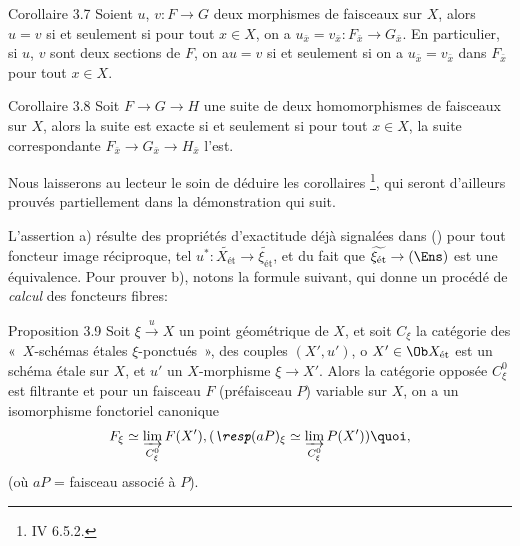 \documentclass[10pt]{../fichiers-configuration-latex/smfart}
\begin{document}
\begin{enonce*}{Corollaire 3.7}
Soient $u$, $v : F \to G$ deux morphismes de faisceaux sur $X$, alors
$u = v$ si et seulement si pour tout $x \in X$, on a $u_{\bar{x}} =
v_{\bar{x}} : F_{\bar{x}} \to G_{\bar{x}}$. En particulier, si $u$,
$v$ sont deux sections de $F$, on a\pageoriginale  $u = v$ si et
seulement si on a
$u_{\bar{x}} = v_{\bar{x}}$ dans $F_{\bar{x}}$ pour tout $x \in X$.
\end{enonce*}

\begin{enonce*}{Corollaire 3.8}
Soit $F \to G \to H$ une suite de deux homomorphismes de faisceaux sur
$X$, alors la suite est exacte si et seulement si pour tout $x \in X$,
la suite correspondante $F_{\bar{x}} \to G_{\bar{x}} \to H_{\bar{x}}$
l'est.
\end{enonce*}

Nous laisserons au lecteur le soin de déduire les corollaires
\footnote{\Cf IV 6.5.2.}, %
qui seront d'ailleurs prouvés partiellement
dans la démonstration qui suit.

L'assertion a) résulte des propriétés d'exactitude déjà signalées
dans () pour tout foncteur image réciproque, tel
$u^{\ast} : \widetilde{X_{\text{ét}}} \to
\widetilde{\xi_{\text{ét}}}$, et du fait que
$\widetilde{\xi_{\text{ét}}} \to (\Ens)$ est une équivalence. Pour
prouver b), notons la formule suivant, qui donne un procédé de
\emph{calcul} des foncteurs fibres:

\begin{enonce*}{Proposition 3.9\footnotemark}
Soit $\xi \xrightarrow{u} X$ un point
géométrique de $X$, et soit $C_{\xi}$ la catégorie des « $X$-schémas étales $\xi$-ponctués », \ie des couples $(X', u')$, o
$X'\in \Ob X_{\text{\rm ét}}$ est un schéma étale sur $X$, et $u'$ un
$X$-morphisme $\xi \to X'$. Alors la catégorie opposée $C^{0}_{\xi}$
est filtrante et pour un faisceau $F$ (\resp préfaisceau $P$)
variable sur $X$, on a un isomorphisme fonctoriel canonique
$$
F_{\xi} \simeq \varinjlim_{C^{0}_{\xi}} F(X'), (\emph{\resp}
(aP)_{\xi} \simeq \varinjlim_{C^{0}_{\xi}} P(X')){\quoi},
$$
(où $aP$ = faisceau associé à $P$).
\end{enonce*}
\end{document}
